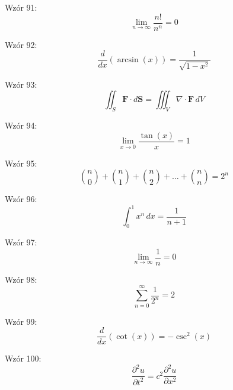 \documentclass{article}
\begin{document}
Wzór 91:
\[ \lim_{{n \to \infty}} \frac{n!}{n^n} = 0 \]

Wzór 92:
\[ \frac{d}{dx}\left(\arcsin(x)\right) = \frac{1}{\sqrt{1-x^2}} \]

Wzór 93:
\[ \iint_S \mathbf{F} \cdot d\mathbf{S} = \iiint_V \nabla \cdot \mathbf{F} \,dV \]

Wzór 94:
\[ \lim_{{x \to 0}} \frac{\tan(x)}{x} = 1 \]

Wzór 95:
\[ \binom{n}{0} + \binom{n}{1} + \binom{n}{2} + \ldots + \binom{n}{n} = 2^n \]

Wzór 96:
\[ \int_{0}^{1} x^n \,dx = \frac{1}{n+1} \]

Wzór 97:
\[ \lim_{{n \to \infty}} \frac{1}{n} = 0 \]

Wzór 98:
\[ \sum_{n=0}^{\infty} \frac{1}{2^n} = 2 \]

Wzór 99:
\[ \frac{d}{dx}\left(\cot(x)\right) = -\csc^2(x) \]

Wzór 100:
\[ \frac{\partial^2u}{\partial t^2} = c^2 \frac{\partial^2u}{\partial x^2} \]
\end{document}
